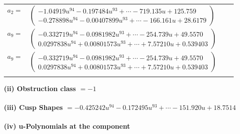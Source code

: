 \documentclass[1p]{elsarticle_modified}
\theoremstyle{definition}
\begin{document}
\begin{tabular}{m{7pt} m{180pt} m{7pt} m{180pt} }
\flushright $a_{2}=$&$\begin{pmatrix}-1.04919 u^{94}-0.197484 u^{93}+\cdots-719.135 u+125.759\\-0.278898 u^{94}-0.00407899 u^{93}+\cdots-166.161 u+28.6179\end{pmatrix}$ \\
\flushright $a_{9}=$&$\begin{pmatrix}-0.332719 u^{94}-0.0981982 u^{93}+\cdots-254.739 u+49.5570\\0.0297838 u^{94}+0.00801573 u^{93}+\cdots+7.57210 u+0.539403\end{pmatrix}$\\ \flushright $a_{9}=$&$\begin{pmatrix}-0.332719 u^{94}-0.0981982 u^{93}+\cdots-254.739 u+49.5570\\0.0297838 u^{94}+0.00801573 u^{93}+\cdots+7.57210 u+0.539403\end{pmatrix}$\\&\end{tabular}
\flushleft \textbf{(ii) Obstruction class $= -1$}\\~\\
\flushleft \textbf{(iii) Cusp Shapes $= -0.425242 u^{94}-0.172495 u^{93}+\cdots-151.920 u+18.7514$}\\~\\
\newpage\renewcommand{\arraystretch}{1}
\flushleft \textbf{(iv) u-Polynomials at the component}\newline \\
\end{document}
